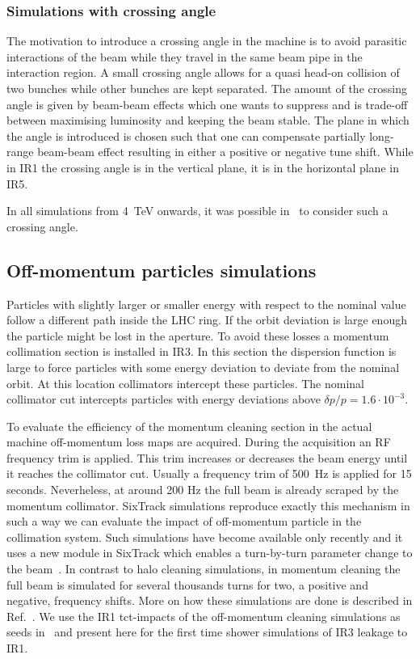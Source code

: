 \subsubsection{Simulations with crossing angle}
The motivation to introduce a crossing angle in the machine is to avoid parasitic interactions of the beam while they travel in the same beam pipe in the interaction region. A small crossing angle allows for a quasi head-on collision of two bunches while other bunches are kept separated. The amount of the crossing angle is given by beam-beam effects which one wants to suppress and is trade-off between maximising luminosity and keeping the beam stable. The plane in which the angle is introduced is chosen such that one can compensate partially long-range beam-beam effect resulting in either a positive or negative tune shift. While in IR1 the crossing angle is in the vertical plane, it is in the horizontal plane in IR5.

In all simulations from 4~TeV onwards, it was possible in \fluka~to consider such a crossing angle.

\subsection{Off-momentum particles simulations}
Particles with slightly larger or smaller energy with respect to the nominal value follow a different path inside the LHC ring. If the orbit deviation is large enough the particle might be lost in the aperture. To avoid these losses a momentum collimation section is installed in IR3. In this section the dispersion function is large to force particles with some energy deviation to deviate from the nominal orbit. At this location collimators intercept these particles. The nominal collimator cut intercepts particles with energy deviations above $\delta p/p = 1.6\cdot 10^{-3}$.

To evaluate the efficiency of the momentum cleaning section in the actual machine off-momentum loss maps are acquired. During the acquisition an RF frequency trim is applied. This trim increases or decreases the beam energy until it reaches the collimator cut. Usually a frequency trim of 500~Hz is applied for 15 seconds. Neverheless, at around 200 Hz the full beam is already scraped by the momentum collimator. SixTrack simulations reproduce exactly this mechanism in such a way we can evaluate the impact of off-momentum particle in the collimation system. Such simulations have become available only recently and it uses a new module in SixTrack which enables a turn-by-turn parameter change to the beam~\cite{KyrreIpac2015}. In contrast to halo cleaning simulations, in momentum cleaning the full beam is simulated for several thousands turns for two, a positive and negative, frequency shifts. More on how these simulations are done is described in Ref.~\cite{HectorsPaper}. 
We use the IR1 tct-impacts of the off-momentum cleaning simulations as seeds in \fluka~and present here for the first time shower simulations of IR3 leakage to IR1. 


